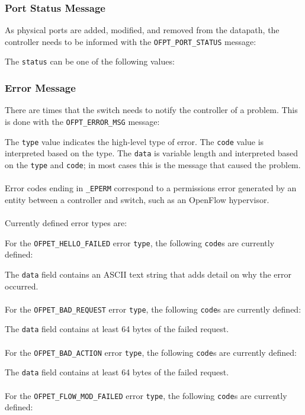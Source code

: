 \subsubsection{Port Status Message}
As physical ports are added, modified, and removed from the datapath, the controller needs to be informed with the \verb|OFPT_PORT_STATUS| message:


The \verb|status| can be one of the following values:

 

\subsubsection{Error Message}
There are times that the switch needs to notify the controller of a problem.  This is done with the \verb|OFPT_ERROR_MSG| message: 	


The \verb|type| value indicates the high-level type of error.  The \verb|code| value is interpreted based on the type.  The \verb|data| is variable length and interpreted based on the \verb|type| and \verb|code|; in most cases this is the message that caused the problem.  
\\\\
Error codes ending in \verb|_EPERM| correspond to a permissions error generated by an entity between a controller and switch, such as an OpenFlow hypervisor. 
\\\\
Currently defined error types are:


For the \verb|OFPET_HELLO_FAILED| error \verb|type|, the following \verb|code|s are currently defined:


The \verb|data| field contains an ASCII text string that adds detail on why the error occurred.
\\\\
For the \verb|OFPET_BAD_REQUEST| error \verb|type|, the following \verb|code|s are currently defined:


The \verb|data| field contains at least 64 bytes of the failed request.
\\\\
For the \verb|OFPET_BAD_ACTION| error \verb|type|, the following \verb|code|s are currently defined:


The \verb|data| field contains at least 64 bytes of the failed request.
\\\\
For the \verb|OFPET_FLOW_MOD_FAILED| error \verb|type|, the following \verb|code|s are currently defined:

